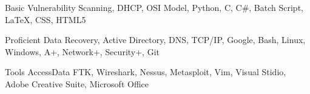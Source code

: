 

\begin{cvhonors}

  \cvhonor
    {Basic} %
    {Vulnerability Scanning, DHCP, OSI Model, Python, C, C\#, Batch Script, \LaTeX, CSS, HTML5} %

  \cvhonor
    {Proficient} %
    {Data Recovery, Active Directory, DNS, TCP/IP, Google, Bash, Linux, Windows, A+, Network+, Security+, Git} %

  \cvhonor
    {Tools} %
    {AccessData FTK, Wireshark, Nessus, Metasploit, Vim, Visual Stidio, Adobe Creative Suite, Microsoft Office} %


\end{cvhonors}